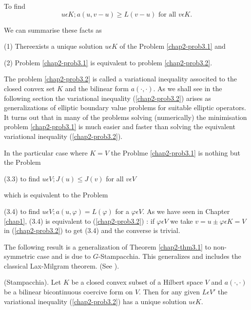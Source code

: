 \begin{problem}\label{chap2-prob3.2}
To find
$$
u \epsilon K ; a(u, v-u) \geq L(v-u) \text{ for all } v \epsilon K.
$$

We can summarise these facts as
\end{problem}

\begin{theorem}\label{chap2-thm3.1}
(1) There\pageoriginale exists a unique solution $u \epsilon K$ of the Problem \ref{chap2-prob3.1} and

(2) Problem \ref{chap2-prob3.1} is equivalent to problem \ref{chap2-prob3.2}.
\end{theorem}

The problem \ref{chap2-prob3.2} is called a variational inequality associted to the closed convex set $K$ and the bilinear form $a(\cdot , \cdot)$. As we shall see in the following section the variational inequality (\ref{chap2-prob3.2}) arises as generalizations of elliptic boundary value problems for suitable elliptic operators. It turns out that in many of the problems solving (numerically) the minimisation problem \ref{chap2-prob3.1} is much easier and faster than solving the equivalent variational inequality (\ref{chap2-prob3.2}).

In the particular case where $K = V$ the Problme \ref{chap2-prob3.1} is nothing but the Problem

(3.3) to find $u \epsilon V ; J(u) \leq J(v)$  for all $v \epsilon V$

which is equivalent to the Problem

(3.4) to find $u \epsilon V ; a(u, \varphi) = L(\varphi)$ for a $\varphi \epsilon V$. As we have seen in Chapter \ref{chap1}, (3.4) is equivalent to (\ref{chap2-prob3.2}) : if $\varphi \epsilon V$ we take $v = u \pm \varphi \epsilon K = V$ in (\ref{chap2-prob3.2}) to get (3.4) and the converse is trivial.

The following result is a generalization of Theorem \ref{chap2-thm3.1} to non-symmetric case and is due to $G$-Stampacchia. This generalizes and includes the classical Lax-Milgram theorem. (See \cite{key43}).

\begin{theorem}\label{chap2-thm3.2}
(Stampacchia). Let $K$ be a closed convex subset of a Hilbert space $V$ and $a(\cdot , \cdot)$ be a bilinear bicontinuous coercive form on $V$. Then for any given $L \epsilon V'$ the variational inequality (\ref{chap2-prob3.2}) has a unique solution $u \epsilon K$. 
\end{theorem}

